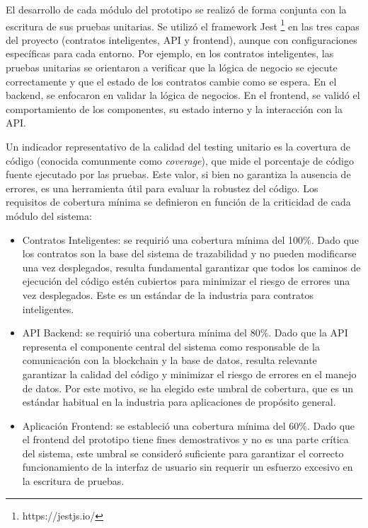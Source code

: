 El desarrollo de cada módulo del prototipo se realizó de forma conjunta con la escritura de sus pruebas unitarias. Se utilizó el framework Jest \footnote{https://jestjs.io/} en las tres capas del proyecto (contratos inteligentes, API y frontend), aunque con configuraciones específicas para cada entorno. Por ejemplo, en los contratos inteligentes, las pruebas unitarias se orientaron a verificar que la lógica de negocio se ejecute correctamente y que el estado de los contratos cambie como se espera. En el backend, se enfocaron en validar la lógica de negocios. En el frontend, se validó el comportamiento de los componentes, su estado interno y la interacción con la API.

Un indicador representativo de la calidad del testing unitario es la covertura de código (conocida comunmente como \textit{coverage}), que mide el porcentaje de código fuente ejecutado por las pruebas. Este valor, si bien no garantiza la ausencia de errores, es una herramienta útil para evaluar la robustez del código. Los requisitos de cobertura mínima se definieron en función de la criticidad de cada módulo del sistema: 

\begin{itemize}
\item Contratos Inteligentes: se requirió una cobertura mínima del 100\%. Dado que los contratos son la base del sistema de trazabilidad y no pueden modificarse una vez desplegados, resulta fundamental garantizar que todos los caminos de ejecución del código estén cubiertos para minimizar el riesgo de errores una vez desplegados. Este es un estándar de la industria para contratos inteligentes.
\item API Backend: se requirió una cobertura mínima del 80\%. Dado que la API representa el componente central del sistema como responsable de la comunicación con la blockchain y la base de datos, resulta relevante garantizar la calidad del código y minimizar el riesgo de errores en el manejo de datos. Por este motivo, se ha elegido este umbral de cobertura, que es un estándar habitual en la industria para aplicaciones de propósito general.
\item Aplicación Frontend: se estableció una cobertura mínima del 60\%. Dado que el frontend del prototipo tiene fines demostrativos y no es una parte crítica del sistema, este umbral se consideró suficiente para garantizar el correcto funcionamiento de la interfaz de usuario sin requerir un esfuerzo excesivo en la escritura de pruebas.
\end{itemize}

